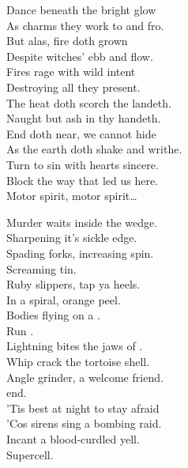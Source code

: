 Dance beneath the  bright glow \\
As charms they work to and fro. \\
But alas, fire doth grown \\
Despite witches' ebb and flow. \\
Fires rage with wild intent \\
Destroying all they present. \\
The heat doth scorch the landeth. \\
Naught but ash in thy handeth. \\

End doth near, we cannot hide \\
As the earth doth shake and writhe. \\
Turn to sin with hearts sincere. \\
Block the way that led us here. \\

Motor spirit, motor spirit… \\




Murder waits inside the wedge. \\
Sharpening it's sickle edge. \\
Spading forks, increasing spin. \\
Screaming tin. \\
Ruby slippers, tap ya heels. \\
In a spiral, orange peel. \\
Bodies flying on a . \\
Run . \\

Lightning bites the jaws of . \\
Whip crack the tortoise shell. \\
Angle grinder, a welcome friend. \\
 end. \\
'Tis best at night to stay afraid \\
'Cos sirens sing a bombing raid. \\
Incant a blood-curdled yell. \\
Supercell. \\

